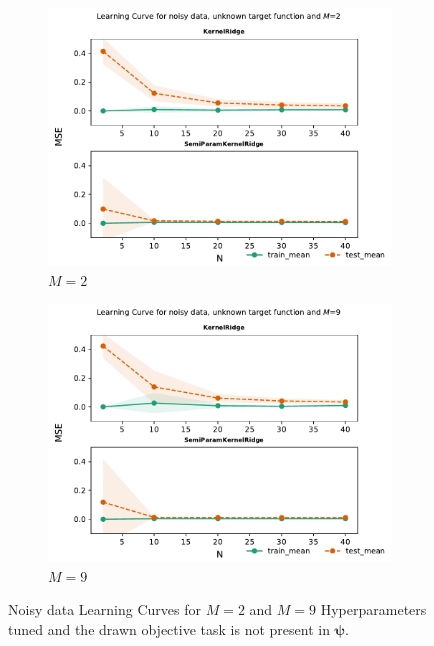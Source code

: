 \documentclass{tran-l}
\theoremstyle{definition}
\theoremstyle{remark}
\numberwithin{equation}{section}
\begin{document}
\begin{figure}[h!]
   \centering
   \begin{subfigure}[b]{0.45\textwidth}
     \centering
     \includegraphics[width=\textwidth]{Figures/unknownnoisy/learningcurve2}
     \caption{$M=2$}
   \end{subfigure}
   \hfill
   \begin{subfigure}[b]{0.45\textwidth}
     \centering
     \includegraphics[width=\textwidth]{Figures/unknownnoisy/learningcurve9}
     \caption{$M=9$}
   \end{subfigure}
   \caption{Noisy data Learning Curves for $M=2$ and $M=9$ Hyperparameters tuned and the drawn objective task is not present in $\boldsymbol{\psi}$.}
\end{figure}
\end{document}
